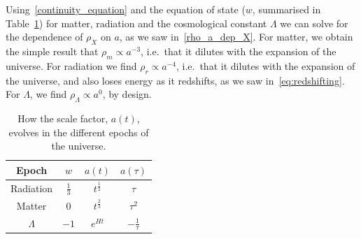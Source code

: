     Using~\eqref{continuity_equation} and the equation of state ($w$, summarised in Table~\ref{lcdm_dep_table})
    for matter, radiation and the cosmological constant $\Lambda$
    we can solve for the dependence of $\rho_X$ on $a$, as we saw in~\eqref{rho_a_dep_X}.
    For matter, we obtain the simple result that $\rho_m\propto a^{-3}$,
    i.e.\ that it dilutes with the expansion of the universe.
    For radiation we find $\rho_r\propto a^{-4}$,
    i.e.\ that it dilutes with the expansion of the universe,
    and also loses energy as it redshifts, as we
    saw in~\eqref{eq:redshifting}.
    For $\Lambda$, we find $\rho_\Lambda\propto a^0$, by design.


    \begin{table}[h!]
    \begin{center}
        \begin{tabular}{ c c c c }
            Epoch & $w$ & $a(t)$ & $a(\tau)$ \\ 
            \toprule
            Radiation & $\frac{1}{3}$ & $t^{\frac{1}{2}}$ & $\tau$ \\
            Matter & $0$ & $t^{\frac{2}{3}}$ & $\tau^2$ \\
            $\Lambda$ & $-1$ & $e^{Ht}$ & $-\frac{1}{\tau}$
        \end{tabular}\caption{
            How the scale factor, $a(t)$, evolves in the
            different epochs of the universe.
        }\label{lcdm_dep_table}
    \end{center}
    \end{table}



